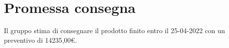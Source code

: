 \section{Promessa consegna}\label{section:promessa_consegna}

Il gruppo stima di consegnare il prodotto finito entro il 25-04-2022 con un preventivo di 14235,00€.
